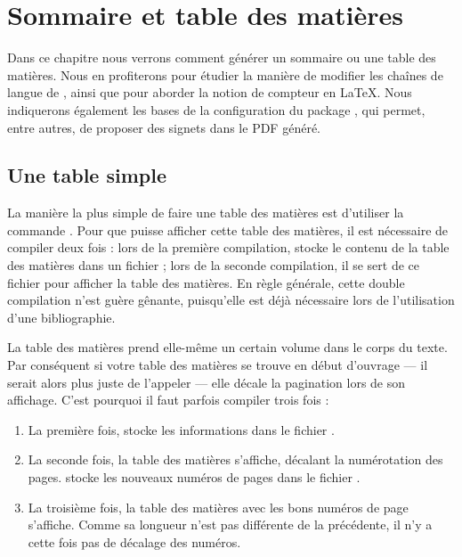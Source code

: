 \chapter{Sommaire et table des matières}\label{toc}

\begin{intro}
Dans ce chapitre nous verrons comment générer un sommaire ou une table des matières. Nous en profiterons pour étudier la manière de modifier les chaînes de langue de , ainsi que pour aborder la notion de compteur en \LaTeX{}. Nous indiquerons également les bases de la configuration du package , qui permet, entre autres, de proposer des signets dans le PDF généré.
\end{intro}

\section{Une table simple}

La manière la plus simple de faire une table des matières est d'utiliser la commande .
Pour que \XeLaTeX{} puisse afficher cette table des matières, il est nécessaire de compiler deux fois : lors de la première compilation, \XeLaTeX{} stocke le contenu de la table des matières dans un fichier  ; lors de la seconde compilation, il se sert de ce fichier pour afficher la table des matières. En règle générale, cette double compilation n'est guère gênante, puisqu'elle est déjà nécessaire lors de l'utilisation d'une bibliographie.

\begin{attention}
La table des matières prend elle-même un certain volume dans le corps du texte. Par conséquent si votre table des matières se trouve en début d'ouvrage --- il serait alors plus juste de l'appeler  --- elle décale la pagination lors de son affichage. C'est pourquoi il faut parfois compiler trois fois :

\begin{enumerate}
\item La première fois, \XeLaTeX{} stocke les informations dans le fichier .
\item La seconde fois, la table des matières  s'affiche, décalant la numérotation des pages. \XeLaTeX{}  stocke les nouveaux numéros de pages  dans le fichier .
\item La troisième fois, la table des matières avec les bons numéros de page   s'affiche. Comme sa longueur n'est pas différente de la précédente, il n'y a cette fois pas de décalage des numéros.
\end{enumerate}

\end{attention}

